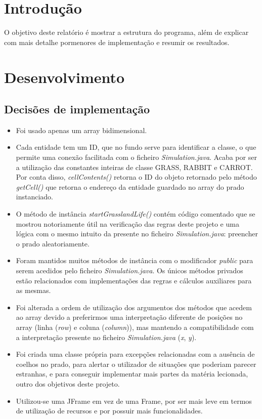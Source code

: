 \documentclass {report}
\begin{document}
\section{Introdução}
	O objetivo deste relatório é mostrar a estrutura do programa, 
	além de explicar com mais detalhe pormenores de implementação e 
	resumir os resultados.\\

\section{Desenvolvimento}
	\subsection{Decisões de implementação}
	\begin{itemize}
		\renewcommand\labelitemi{--}
		\item Foi usado apenas um array bidimensional.
		\item Cada entidade tem um ID, que no fundo serve para identificar a classe,
					o que permite uma conexão facilitada com o ficheiro 
					\textit{Simulation.java}. Acaba por ser a utilização das constantes 
					inteiras de classe GRASS, RABBIT e CARROT.\\
					Por conta disso, \textit{cellContents()} retorna o ID do objeto 
					retornado pelo método \textit{getCell()} que retorna o endereço 
					da entidade guardado no array do prado instanciado.
		\item O método de instância \textit{startGrasslandLife()} contém código 
					comentado que se mostrou notoriamente útil na verificação das 
					regras deste projeto e uma lógica com o mesmo intuito da presente 
					no ficheiro \textit{Simulation.java}: preencher o prado 
					aleatoriamente.
		\item Foram mantidos muitos métodos de instância com o modificador \textit{public} 
					para serem acedidos pelo ficheiro \textit{Simulation.java}. Os únicos 
					métodos privados estão relacionados com implementações das regras e 
					cálculos auxiliares para as mesmas.
		\item Foi alterada a ordem de utilização dos argumentos dos métodos que 
					acedem ao array devido a preferirmos uma interpretação diferente de 
					posições no array (linha (\textit{row}) e coluna (\textit{column})),
					mas mantendo a compatibilidade com a interpretação presente no 
					ficheiro \textit{Simulation.java} (\textit{x}, \textit{y}).
		\item Foi criada uma classe própria para excepções relacionadas com a 
					ausência de coelhos no prado, para alertar o utilizador de situações 
					que poderiam parecer estranhas, e para conseguir implementar mais 
					partes da matéria lecionada, outro dos objetivos deste projeto.
		\item Utilizou-se uma JFrame em vez de uma Frame, por ser mais leve em 
					termos de utilização de recursos e por possuir mais funcionalidades.
	\end{itemize}	
\end{document}
